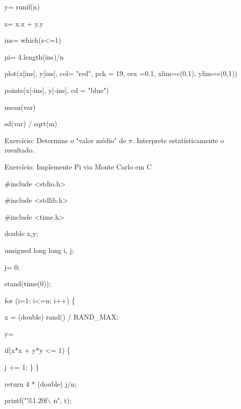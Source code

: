 \documentclass[a4paper, 12pt]{article}
\begin{document}
y= runif(n)

z= x.x + y.y

ins= which(z<=1)

pi= 4.length(ins)/n

plot(x[ins], y[ins], col= "red", pch = 19, cex =0.1, xlim=c(0,1), ylim=c(0,1))

points(x[-ins], y[-ins], cd = "blue")

mean(var)

sd(var) / sqrt(m)

Exercício: Determine o "valor médio" de $\pi$. Interprete estatísticamente o resultado.

Exercício: Implemente Pi via Monte Carlo em C

\#include <stdio.h>

\#include <stdlib.h>

\#include <time.h>

double x,y;

unsigned long long i, j;

j= 0;

stand(time(0));

for (i=1; i<=n; i++) \{

x = (double) rand() / RAND\_MAX;

y=

if(x*x + y*y <= 1) \{

j += 1;
\}
\}

return 4 * (double) j/n;

printf("\%1.20f$\backslash$ n", t);
\end{document}
